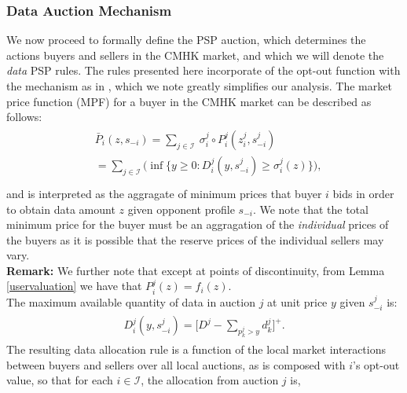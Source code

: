 \documentclass[12pt]{article}
\theoremstyle{definition}
\newcommand{\vs}{\varsigma}
\newcommand{\mcI}{\mathcal{I}}
\newcommand{\g}{\sigma}
\begin{document}
\begin{multicols}{2}
\subsubsection{Data Auction Mechanism}\label{datamechanism}
We now proceed to formally define the PSP auction, which determines the actions 
buyers and sellers in the CMHK market, and which we will denote the \emph{data}
PSP rules. The rules presented here incorporate of the opt-out function with the
mechanism as in \cite{lazar}, which we note greatly simplifies our
analysis. 
The market price function (MPF) for a buyer in the CMHK market
can be described as follows:
\begin{align}\label{dataprice}
\begin{split}
    &\bar{P}_i(z, s_{-i}) =\displaystyle\sum_{j\in\mcI} \ \g_i^j \circ P_i^j(z_i^j,
s_{-i}^j) \\
    &= \sum_{j\in\mcI}\bigg(\inf\bigg\lbrace y\ge 0 : 
    {D_i^j}(y,s_{-i}^j) \ge \g_i^j(z) \bigg\rbrace \bigg),\\
\end{split}
\end{align}
and is interpreted as the aggragate of minimum prices that buyer $i$ bids in
order to obtain
data amount $z$ given opponent profile $s_{-i}$. We note that
the total minimum price for the buyer must be an aggragation of the
\emph{individual} prices of the buyers as it is possible that the reserve prices
of the individual sellers may vary.\\
\textbf{Remark:} We further note that except at points of discontinuity, from
Lemma \ref{uservaluation} we have that $P_i^j(z) = f_i(z)$. \\
The maximum available quantity of data in auction
$j$ at unit price $y$ given $s_{-i}^j$ is: 
\begin{align}
\begin{split}\label{datacomposed}
    D_i^j(y,s_{-i}^j) = \bigg\lbrack D^j - \sum_{p_k^j> y} d_k^j\bigg\rbrack^+.
\end{split}
\end{align}
The resulting data allocation rule is a function of the local market
interactions between buyers and sellers over all local auctions, as is composed with $i$'s opt-out value, so that for each $i \in \mcI$, the
allocation from auction $j$ is,
\begin{align}\label{dataallocation}

\end{align}
\end{multicols}
\end{document}
